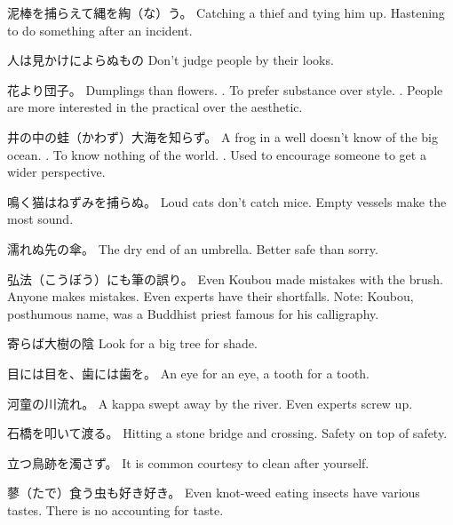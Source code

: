 \par{泥棒を捕らえて縄を綯（な）う。 \hfill\break
Catching a thief and tying him up. \hfill\break
Hastening to do something after an incident. }

\par{人は見かけによらぬもの \hfill\break
Don't judge people by their looks. }

\par{花より団子。 \hfill\break
Dumplings than flowers. \hfill{}. To prefer substance over style. \hfill{}. People are more interested in the practical over the aesthetic. }

\par{井の中の蛙（かわず）大海を知らず。 \hfill\break
A frog in a well doesn't know of the big ocean. \hfill{}. To know nothing of the world. \hfill{}. Used to encourage someone to get a wider perspective. }

\par{鳴く猫はねずみを捕らぬ。 \hfill\break
Loud cats don't catch mice. \hfill\break
Empty vessels make the most sound. }

\par{濡れぬ先の傘。 \hfill\break
The dry end of an umbrella. \hfill\break
Better safe than sorry. }

\par{弘法（こうぼう）にも筆の誤り。 \hfill\break
Even Koubou made mistakes with the brush. \hfill\break
Anyone makes mistakes. \hfill\break
Even experts have their shortfalls. \hfill\break
\hfill\break
Note: Koubou, posthumous name, was a Buddhist priest famous for his calligraphy. }

\par{寄らば大樹の陰 \hfill\break
Look for a big tree for shade. }

\par{目には目を、歯には歯を。 \hfill\break
An eye for an eye, a tooth for a tooth. }

\par{河童の川流れ。 \hfill\break
A kappa swept away by the river. \hfill\break
Even experts screw up. }

\par{石橋を叩いて渡る。 \hfill\break
Hitting a stone bridge and crossing. \hfill\break
Safety on top of safety. }

\par{立つ鳥跡を濁さず。 \hfill\break
It is common courtesy to clean after yourself. }

\par{蓼（たで）食う虫も好き好き。 \hfill\break
Even knot-weed eating insects have various tastes. \hfill\break
There is no accounting for taste. }

